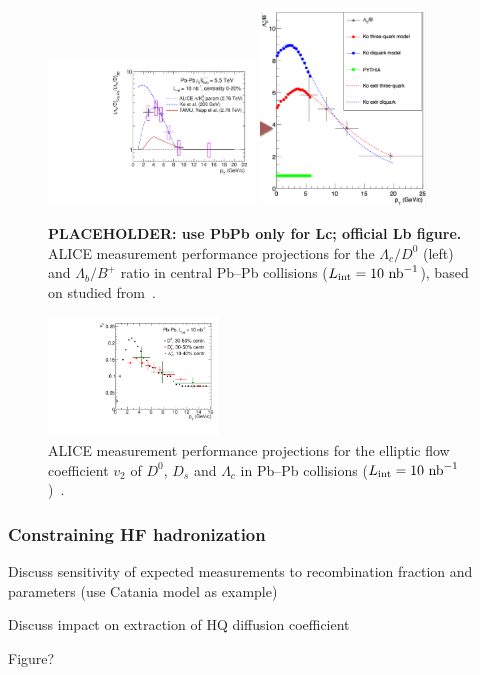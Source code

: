 \begin{figure}[ht]
\centering
\includegraphics[width=0.49\textwidth]{hf/figures/LambdacOverD0_DoubleRatio_10nb_TDR.pdf}
\includegraphics[width=0.39\textwidth]{hf/figures/LbOverB_tmp.pdf}
\caption{{\bf PLACEHOLDER: use PbPb only for Lc; official Lb figure.} ALICE measurement performance projections for the $\Lambda_c/D^0$ (left) and $\Lambda_b/B^+$ ratio in central Pb--Pb collisions ($L_{\rm int }=10~{\rm nb}^{-1}$), based on studied from~\cite{ITSTDR}.}
\label{fig:HFLcLb}
\end {figure}




\begin{figure}[ht]
\centering
\includegraphics[width=0.40\textwidth]{hf/figures/D0DsLc_v2_TDR.pdf}
\caption{ALICE measurement performance projections for the elliptic flow coefficient $v_2$ of $D^0$, $D_s$ and $\Lambda_c$ in Pb--Pb collisions ($L_{\rm int }=10~{\rm nb}^{-1}$)~\cite{ITSTDR}.}
\label{fig:D0DsLcv2}
\end {figure}



\subsubsection{Constraining HF hadronization}

Discuss sensitivity of expected measurements to recombination fraction and parameters (use Catania model as example)

Discuss impact on extraction of HQ diffusion coefficient

Figure?
